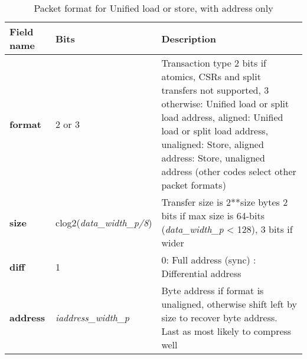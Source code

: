 \begin{table}[htp]
  \centering
  \caption{Packet format for Unified load or store, with address only}
  \label{tab:te_datadx0y1}
  \begin{tabulary}{\textwidth}{|l|p{40mm}|p{90mm}|}
    \hline
    {\bf Field name} & {\bf Bits} & {\bf Description} \\
    \hline
    \textbf{format} & 	2 or 3	& Transaction type	2 bits if atomics, CSRs and split transfers not supported, 3 otherwise: Unified load or split load address, aligned: Unified load or split load address, unaligned: Store, aligned address: Store, unaligned address\newline
		(other codes select other packet formats)\\
    \hline
    \textbf{size} & clog2(\textit{data\_width\_p/8}) & Transfer size is 2**size bytes	2 bits if max size is 64-bits (\textit{data\_width\_p} < 128), 3 bits if wider \\
    \hline
    \textbf{diff} & 1 & 0: Full address (sync)	:  Differential address\\
    \hline
    \textbf{address} &  \textit {iaddress\_width\_p} & Byte address if format is unaligned, otherwise shift left by size to recover byte address. Last as most likely to compress well \\
    \hline
  \end{tabulary}
\end{table}


